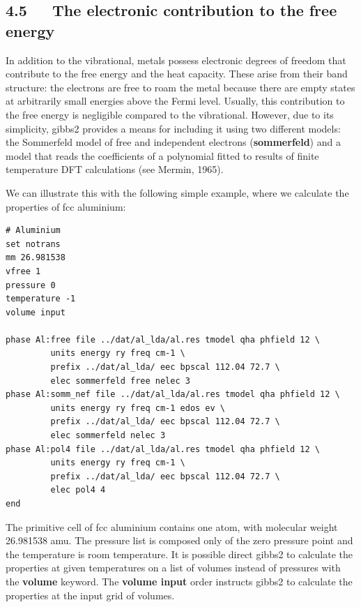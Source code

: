 \documentclass[a4paper]{article}
\begin{document}
\subsection{4.5~~~The electronic contribution to the free energy%
  \label{the-electronic-contribution-to-the-free-energy}%
}

In addition to the vibrational, metals possess electronic degrees of
freedom that contribute to the free energy and the heat
capacity. These arise from their band structure: the electrons are
free to roam the metal because there are empty states at arbitrarily
small energies above the Fermi level. Usually, this contribution to
the free energy is negligible compared to the vibrational. However,
due to its simplicity, gibbs2 provides a means for including it using
two different models: the Sommerfeld model of free and independent
electrons (\textbf{sommerfeld}) and a model that reads the coefficients of
a polynomial fitted to results of finite temperature DFT calculations
(see Mermin, 1965).

We can illustrate this with the following simple example, where we
calculate the properties of fcc aluminium:
%
\gibbslist
\begin{lstlisting}
# Aluminium
set notrans
mm 26.981538
vfree 1
pressure 0
temperature -1
volume input

phase Al:free file ../dat/al_lda/al.res tmodel qha phfield 12 \
         units energy ry freq cm-1 \
         prefix ../dat/al_lda/ eec bpscal 112.04 72.7 \
         elec sommerfeld free nelec 3
phase Al:somm_nef file ../dat/al_lda/al.res tmodel qha phfield 12 \
         units energy ry freq cm-1 edos ev \
         prefix ../dat/al_lda/ eec bpscal 112.04 72.7 \
         elec sommerfeld nelec 3
phase Al:pol4 file ../dat/al_lda/al.res tmodel qha phfield 12 \
         units energy ry freq cm-1 \
         prefix ../dat/al_lda/ eec bpscal 112.04 72.7 \
         elec pol4 4
end
\end{lstlisting}

The primitive cell of fcc aluminium contains one atom, with molecular
weight 26.981538 amu. The pressure list is composed only of the zero
pressure point and the temperature is room temperature. It is possible
direct gibbs2 to calculate the properties at given temperatures on a
list of volumes instead of pressures with the \textbf{volume} keyword. The
\textbf{volume input} order instructs gibbs2 to calculate the properties at
the input grid of volumes.
\end{document}
